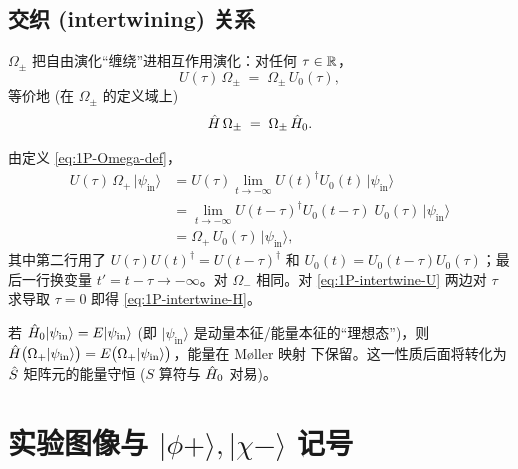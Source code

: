 \subsection{交织 (intertwining) 关系}
\label{ssec:1P-intertwine}

\begin{theorem}
\label{thm:1P-intertwine}
$\Omega_\pm$ 把自由演化“缠绕”进相互作用演化：对任何 $\tau\in\mathbb{R}$，
\begin{equation}
  U(\tau)\,\Omega_\pm \;=\; \Omega_\pm\,U_0(\tau),
  \label{eq:1P-intertwine-U}
\end{equation}
等价地 (在 $\Omega_\pm$ 的定义域上)
\begin{equation}
  \hat{H}\,\Omega_\pm \;=\; \Omega_\pm\,\hat{H}_0 .
  \label{eq:1P-intertwine-H}
\end{equation}
\end{theorem}

\begin{proof*}
由定义 \eqref{eq:1P-Omega-def}，
\begin{align*}
  U(\tau)\,\Omega_+\,|\psi_{\text{in}}\rangle
  &=U(\tau)\lim_{t\to-\infty}U(t)^\dagger U_0(t)\,|\psi_{\text{in}}\rangle\\
  &=\lim_{t\to-\infty}U(t-\tau)^{\dagger}U_0(t-\tau)\;U_0(\tau)\,|\psi_{\text{in}}\rangle\\
  &=\Omega_+\,U_0(\tau)\,|\psi_{\text{in}}\rangle,
\end{align*}
其中第二行用了 $U(\tau)U(t)^{\dagger}=U(t-\tau)^{\dagger}$ 和
$U_0(t)=U_0(t-\tau)U_0(\tau)$；最后一行换变量
$t'=t-\tau\to-\infty$。对 $\Omega_-$ 相同。对 \eqref{eq:1P-intertwine-U}
两边对 $\tau$ 求导取 $\tau=0$ 即得 \eqref{eq:1P-intertwine-H}。
\end{proof*}

\begin{corollary}
\label{cor:1P-energy}
若 $\hat{H}_0|\psi_{\text{in}}\rangle=E|\psi_{\text{in}}\rangle$ (即
$|\psi_{\text{in}}\rangle$ 是动量本征/能量本征的“理想态”)，则
$\hat{H}\bigl(\Omega_+|\psi_{\text{in}}\rangle\bigr)
=E\bigl(\Omega_+|\psi_{\text{in}}\rangle\bigr)$，能量在 Møller 映射
下保留。这一性质后面将转化为 $\hat{S}$ 矩阵元的能量守恒
($S$ 算符与 $\hat{H}_0$ 对易)。
\end{corollary}

\section{实验图像与 $|\phi+\rangle, |\chi-\rangle$ 记号}
\label{sec:1P-experiment}

